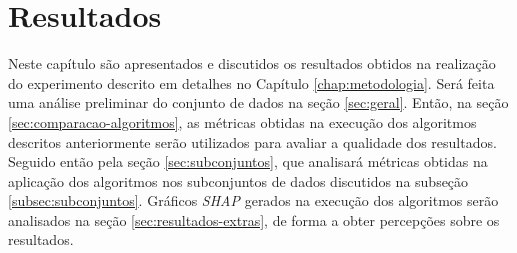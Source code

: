 \chapter{Resultados}
\label{chap:resultados}

Neste capítulo são apresentados e discutidos os resultados obtidos na realização do experimento descrito em detalhes no Capítulo \ref{chap:metodologia}. 
Será feita uma análise preliminar do conjunto de dados na seção \ref{sec:geral}.
Então, na seção \ref{sec:comparacao-algoritmos}, as métricas obtidas na execução dos algoritmos descritos anteriormente serão utilizados para avaliar a qualidade dos resultados.
Seguido então pela seção \ref{sec:subconjuntos}, que analisará métricas obtidas na aplicação dos algoritmos nos subconjuntos de dados discutidos na subseção \ref{subsec:subconjuntos}.
Gráficos \textit{SHAP} gerados na execução dos algoritmos serão analisados na seção \ref{sec:resultados-extras}, de forma a obter percepções sobre os resultados.








